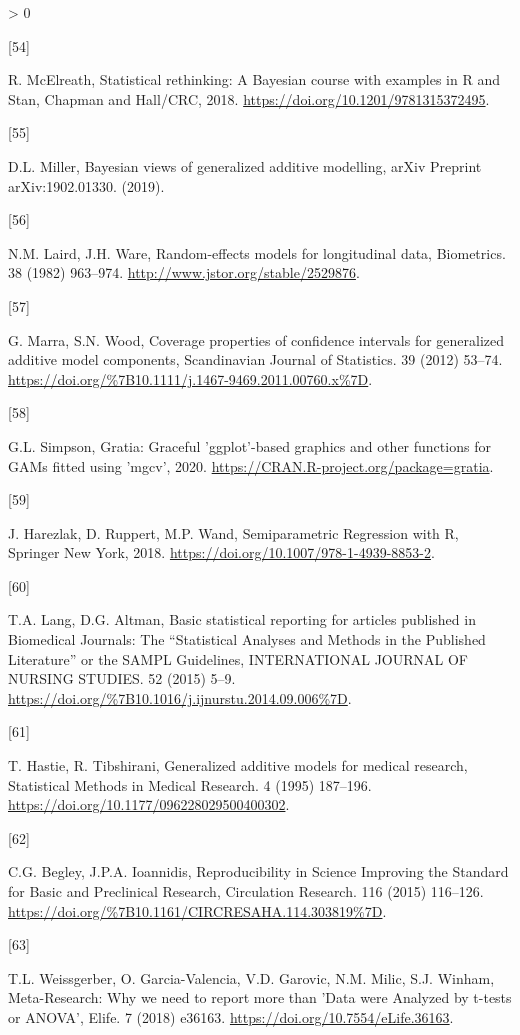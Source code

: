 \documentclass[
]{article}
\newlength{\cslhangindent}
\newlength{\csllabelwidth}
\newenvironment{CSLReferences}[2] %
 {%
  \setlength{\parindent}{0pt}
  \ifodd #1 \everypar{\setlength{\hangindent}{\cslhangindent}}\ignorespaces\fi
  \ifnum #2 > 0
  \setlength{\parskip}{#2\baselineskip}
  \fi
 }%
 {}
\newcommand{\CSLLeftMargin}[1]{\parbox[t]{\csllabelwidth}{#1}}
\newcommand{\CSLRightInline}[1]{\parbox[t]{\linewidth - \csllabelwidth}{#1}\break}
\begin{document}
\begin{CSLReferences}{0}{0}
\leavevmode\hypertarget{ref-mcelreath2018}{}%
\CSLLeftMargin{{[}54{]} }
\CSLRightInline{R. McElreath, {Statistical rethinking: A Bayesian course with examples in R and Stan}, {Chapman and Hall/CRC}, 2018. \url{https://doi.org/10.1201/9781315372495}.}

\leavevmode\hypertarget{ref-miller2019}{}%
\CSLLeftMargin{{[}55{]} }
\CSLRightInline{D.L. Miller, Bayesian views of generalized additive modelling, arXiv Preprint arXiv:1902.01330. (2019).}

\leavevmode\hypertarget{ref-laird1982}{}%
\CSLLeftMargin{{[}56{]} }
\CSLRightInline{N.M. Laird, J.H. Ware, Random-effects models for longitudinal data, Biometrics. 38 (1982) 963--974. \url{http://www.jstor.org/stable/2529876}.}

\leavevmode\hypertarget{ref-marra2012}{}%
\CSLLeftMargin{{[}57{]} }
\CSLRightInline{G. Marra, S.N. Wood, Coverage properties of confidence intervals for generalized additive model components, {Scandinavian Journal of Statistics}. {39} (2012) 53--74. \url{https://doi.org/\%7B10.1111/j.1467-9469.2011.00760.x\%7D}.}

\leavevmode\hypertarget{ref-gratia}{}%
\CSLLeftMargin{{[}58{]} }
\CSLRightInline{G.L. Simpson, Gratia: Graceful 'ggplot'-based graphics and other functions for GAMs fitted using 'mgcv', 2020. \url{https://CRAN.R-project.org/package=gratia}.}

\leavevmode\hypertarget{ref-harezlak2018}{}%
\CSLLeftMargin{{[}59{]} }
\CSLRightInline{J. Harezlak, D. Ruppert, M.P. Wand, {Semiparametric Regression with R}, Springer New York, 2018. \url{https://doi.org/10.1007/978-1-4939-8853-2}.}

\leavevmode\hypertarget{ref-lang2015}{}%
\CSLLeftMargin{{[}60{]} }
\CSLRightInline{T.A. Lang, D.G. Altman, {Basic statistical reporting for articles published in Biomedical Journals: The ``Statistical Analyses and Methods in the Published Literature{''} or the SAMPL Guidelines}, INTERNATIONAL JOURNAL OF NURSING STUDIES. {52} (2015) 5--9. \url{https://doi.org/\%7B10.1016/j.ijnurstu.2014.09.006\%7D}.}

\leavevmode\hypertarget{ref-hastie1995}{}%
\CSLLeftMargin{{[}61{]} }
\CSLRightInline{T. Hastie, R. Tibshirani, Generalized additive models for medical research, {Statistical Methods in Medical Research}. 4 (1995) 187--196. \url{https://doi.org/10.1177/096228029500400302}.}

\leavevmode\hypertarget{ref-begley2015}{}%
\CSLLeftMargin{{[}62{]} }
\CSLRightInline{C.G. Begley, J.P.A. Ioannidis, {Reproducibility in Science Improving the Standard for Basic and Preclinical Research}, {Circulation Research}. {116} (2015) 116--126. \url{https://doi.org/\%7B10.1161/CIRCRESAHA.114.303819\%7D}.}

\leavevmode\hypertarget{ref-weissgerber2018}{}%
\CSLLeftMargin{{[}63{]} }
\CSLRightInline{T.L. Weissgerber, O. Garcia-Valencia, V.D. Garovic, N.M. Milic, S.J. Winham, {Meta-Research: Why we need to report more than 'Data were Analyzed by t-tests or ANOVA'}, Elife. 7 (2018) e36163. \url{https://doi.org/10.7554/eLife.36163}.}

\end{CSLReferences}
\end{document}
